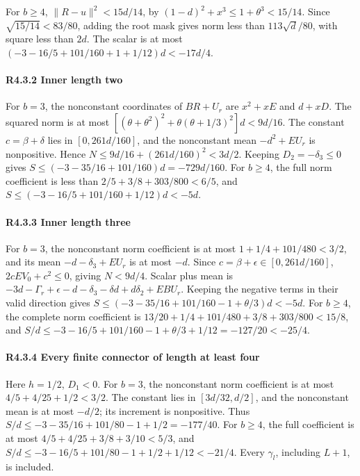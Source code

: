 For \(b\ge4\), \(\|R-u\|^2<15d/14\), by \((1-d)^2+x^3\le1+\theta^3<15/14\). Since \(\sqrt{15/14}<83/80\), adding the root mask gives norm less than \(113\sqrt d/80\), with square less than \(2d\). The scalar is at most \((-3-16/5+101/160+1+1/12)d<-17d/4\).

\paragraph{R4.3.2 Inner length two}

For \(b=3\), the nonconstant coordinates of \(BR+U_r\) are \(x^2+xE\) and \(d+xD\). The squared norm is at most \([(\theta+\theta^2)^2+\theta(\theta+1/3)^2]d<9d/16\). The constant \(c=\beta+\delta\) lies in \([0,\allowbreak \allowbreak  261d/160]\), and the nonconstant mean \(-d^2+EU_r\) is nonpositive. Hence \(N\le9d/16+(261d/160)^2<3d/2\). Keeping \(D_2=- \delta_3\le0\) gives \(S\le(-3-35/16+101/160)d=-729d/160\). For \(b\ge4\), the full norm coefficient is less than \(2/5+3/8+303/800<6/5\), and \(S\le(-3-16/5+101/160+1/12)d<-5d\).

\paragraph{R4.3.3 Inner length three}

For \(b=3\), the nonconstant norm coefficient is at most \(1+1/4+101/480<3/2\), and its mean \(-d- \delta_3+EU_r\) is at most \(-d\). Since \(c=\beta+\epsilon\in[0,\allowbreak \allowbreak  261d/160]\), \(2cEV_0+c^2\le0\), giving \(N<9d/4\). Scalar plus mean is \(-3d-\Gamma_r+\epsilon-d- \delta_3-\delta d+d \delta_2+EBU_r\). Keeping the negative terms in their valid direction gives \(S\le(-3-35/16+101/160-1+\theta/3)d<-5d\). For \(b\ge4\), the complete norm coefficient is \(13/20+1/4+101/480+3/8+303/800<15/8\), and \(S/d\le-3-16/5+101/160-1+\theta/3+1/12=-127/20<-25/4\).

\paragraph{R4.3.4 Every finite connector of length at least four}

Here \(h=1/2\), \(D_1<0\). For \(b=3\), the nonconstant norm coefficient is at most \(4/5+4/25+1/2<3/2\). The constant lies in \([3d/32,\allowbreak \allowbreak  d/2]\), and the nonconstant mean is at most \(-d/2\); its increment is nonpositive. Thus \(S/d\le-3-35/16+101/80-1+1/2=-177/40\). For \(b\ge4\), the full coefficient is at most \(4/5+4/25+3/8+3/10<5/3\), and \(S/d\le-3-16/5+101/80-1+1/2+1/12<-21/4\). Every \(\gamma_l\), including \(L+1\), is included.

